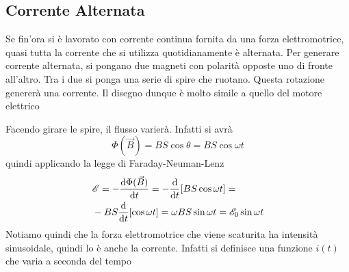 \subsection{Corrente Alternata}
Se fin'ora si è lavorato con corrente continua fornita da una forza elettromotrice, quasi tutta
la corrente che si utilizza quotidianamente è alternata. Per generare corrente alternata, si
pongano due magneti con polarità opposte uno di fronte all'altro. Tra i due si ponga una serie
di spire che ruotano. Questa rotazione genererà una corrente. Il disegno dunque è molto simile
a quello del motore elettrico
\begin{center}
\end{center}
Facendo girare le spire, il flusso varierà. Infatti si avrà
\begin{equation*}
  \Phi(\vec{B})=BS\cos\theta = BS\cos\omega t
\end{equation*}
quindi applicando la legge di Faraday-Neuman-Lenz
\begin{align*}
  &\mathcal{E} = -\frac{\mathop{}\!\mathrm{d}\Phi(\vec{B})}{\mathop{}\!\mathrm{d} t} = -\frac{\mathop{}\!\mathrm{d}}{\mathop{}\!\mathrm{d} t}[BS\cos\omega t] =\\
  &-BS \frac{\mathop{}\!\mathrm{d}}{\mathop{}\!\mathrm{d} t}[\cos\omega t]=\omega BS\sin\omega t= \mathcal{E}_0\sin\omega t 
\end{align*}
Notiamo quindi che la forza elettromotrice che viene scaturita ha intensità sinusoidale, quindi
lo è anche la corrente. Infatti si definisce una funzione $i(t)$ che varia a seconda del tempo
